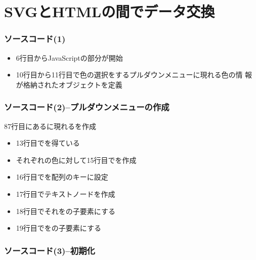 

\frame{\maketitle}
\section{SVGとHTMLの間でデータ交換}
\begin{frame}[containsverbatim]
 \frametitle{ソースコード(1)}
 \begin{itemize}
	\item 6行目からJavaScriptの部分が開始
	\item 10行目から11行目で色の選択をするプルダウンメニューに現れる色の情
				報が格納されたオブジェクトを定義
 \end{itemize}
\end{frame}
\begin{frame}[containsverbatim]
 \frametitle{ソースコード(2)--プルダウンメニューの作成}
 87行目にあるに現れるを作成
 \begin{itemize}
	\item 13行目でを得ている
	\item それぞれの色に対して15行目でを作成
	\item 16行目でを配列のキーに設定
	\item 17行目でテキストノードを作成
	\item 18行目でそれをの子要素にする
	\item 19行目でをの子要素にする
 \end{itemize}
\end{frame}
\begin{frame}[containsverbatim]
 \frametitle{ソースコード(3)--初期化}
\end{frame}
